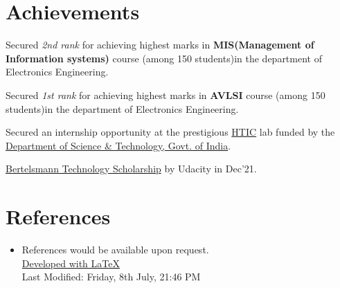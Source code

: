 \documentclass[a4paper,20pt]{article}
\newcommand{\resumeSubHeadingListStart}{\begin{itemize}[leftmargin=*]}
\newcommand{\resumeSubHeadingListEnd}{\end{itemize}}
\begin{document}
\section{Achievements}
\begin{description}[font=$\bullet$]
\item{Secured \textit{2nd rank} for achieving highest marks in \textbf{MIS(Management of Information systems)} course (among 150 students)in the department of Electronics Engineering.}
\item{Secured \textit{1st rank} for achieving highest marks in \textbf{AVLSI} course (among 150 students)in the department of Electronics Engineering.}
\item{Secured an internship opportunity at the prestigious \href{http://hticlab.org/htic/}{HTIC} lab funded by the \href{https://dst.gov.in/}{Department of Science \& Technology, Govt. of India}.}
\item{\href{https://www.udacity.com/bertelsmann-tech-scholarships}{Bertelsmann Technology Scholarship} by Udacity in Dec'21.}
\end{description}
\vspace{2pt}

\section{References}
  \resumeSubHeadingListStart
   \item References would be available upon request.\\
   \vspace{300 pt}
   {\href{https://raw.githubusercontent.com/addy1997/CV/main/Adwait_CV.tex}{Developed with \LaTeX}} \\
   {Last Modified: Friday, 8th July, 21:46 PM}
  \resumeSubHeadingListEnd
\end{document}
